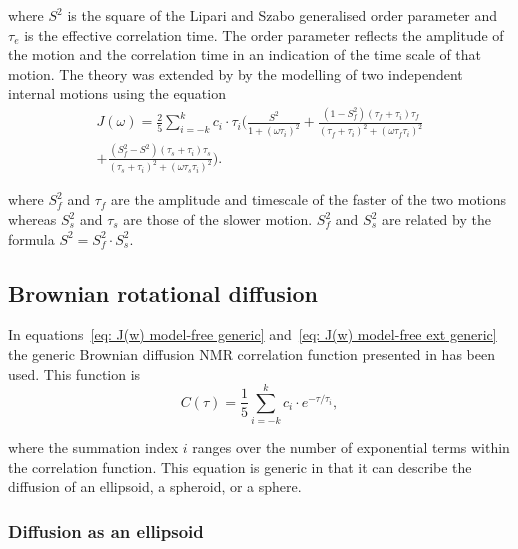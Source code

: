 \begin{htmlonly}
\begin{htmlonly}
\noindent where $S^2$ is the square of the Lipari and Szabo generalised order parameter and $\tau_e$ is the effective correlation time.  The order parameter reflects the amplitude of the motion and the correlation time in an indication of the time scale of that motion.  The theory was extended by \citet{Clore90a} by the modelling of two independent internal motions using the equation
\begin{multline} \label{eq: J(w) model-free ext generic}
    J(\omega) = \frac{2}{5} \sum_{i=-k}^k c_i \cdot \tau_i \Bigg(
        \frac{S^2}{1 + (\omega \tau_i)^2}
        + \frac{(1 - S^2_f)(\tau_f + \tau_i)\tau_f}{(\tau_f + \tau_i)^2 + (\omega \tau_f \tau_i)^2}       \\
        + \frac{(S^2_f - S^2)(\tau_s + \tau_i)\tau_s}{(\tau_s + \tau_i)^2 + (\omega \tau_s \tau_i)^2}
    \Bigg).
\end{multline}

\noindent where $S^2_f$ and $\tau_f$ are the amplitude and timescale of the faster of the two motions whereas $S^2_s$ and $\tau_s$ are those of the slower motion.  $S^2_f$ and $S^2_s$ are related by the formula $S^2 = S^2_f \cdot S^2_s$.



\subsection{Brownian rotational diffusion}

In equations~\eqref{eq: J(w) model-free generic} and~\eqref{eq: J(w) model-free ext generic} the generic Brownian diffusion NMR correlation function presented in \citet{dAuvergne06} has been used.  This function is
\begin{equation} \label{eq: C(tau) generic}
    C(\tau) = \frac{1}{5} \sum_{i=-k}^k c_i \cdot e^{-\tau/\tau_i},
\end{equation}

\noindent where the summation index $i$ ranges over the number of exponential terms within the correlation function.  This equation is generic in that it can describe the diffusion of an ellipsoid, a spheroid, or a sphere.



\subsubsection{Diffusion as an ellipsoid}


\end{htmlonly}
\end{htmlonly}
